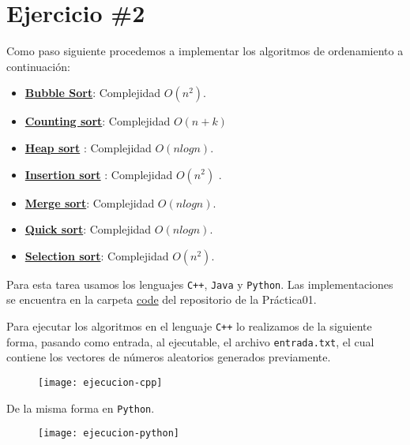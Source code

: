 \section*{Ejercicio \#2}
Como paso siguiente procedemos a implementar los algoritmos de ordenamiento a continuación:
\begin{itemize}
    \item \href{https://github.com/syordya/CSUNSA-EDA/tree/master/Practica01/code/BubbleSort}{\textbf{Bubble Sort}}: Complejidad $O(n^2)$.
    \item \href{https://github.com/syordya/CSUNSA-EDA/tree/master/Practica01/code/CountingSort}{\textbf{Counting sort}}: Complejidad $O(n+k)$
    \item \href{https://github.com/syordya/CSUNSA-EDA/tree/master/Practica01/code/HeapSort}{\textbf{Heap sort}} : Complejidad $O(nlogn)$.
    \item \href{https://github.com/syordya/CSUNSA-EDA/tree/master/Practica01/code/InsertionSort}{\textbf{Insertion sort}} : Complejidad $O(n^2)$ \cite{cormen}.
    \item \href{https://github.com/syordya/CSUNSA-EDA/tree/master/Practica01/code/MergeSort}{\textbf{Merge sort}}: Complejidad $O(n log n)$.
    \item \href{https://github.com/syordya/CSUNSA-EDA/tree/master/Practica01/code/QuickSort}{\textbf{Quick sort}}: Complejidad $O(nlogn)$.
    \item \href{https://github.com/syordya/CSUNSA-EDA/tree/master/Practica01/code/SelectionSort}{\textbf{Selection sort}}: Complejidad $O(n^2)$.
\end{itemize}

Para esta tarea usamos los lenguajes \verb!C++!, \verb!Java! y \verb!Python!. Las implementaciones se encuentra en la carpeta \href{https://github.com/syordya/CSUNSA-EDA/tree/master/Practica01/code}{code} del repositorio de la Práctica01.

Para ejecutar los algoritmos en el lenguaje \verb!C++! lo realizamos de la siguiente forma, pasando como entrada, al ejecutable, el archivo \verb!entrada.txt!, el cual contiene los vectores de números aleatorios generados previamente.%
\begin{figure}[H]
  \centering
  \texttt{[image: ejecucion-cpp]}
  \label{fig:ejecucion-cpp}
\end{figure}

De la misma forma en \verb!Python!.%
\begin{figure}[H]
  \centering
  \texttt{[image: ejecucion-python]}
  \label{fig:ejecucion-python}
\end{figure}

